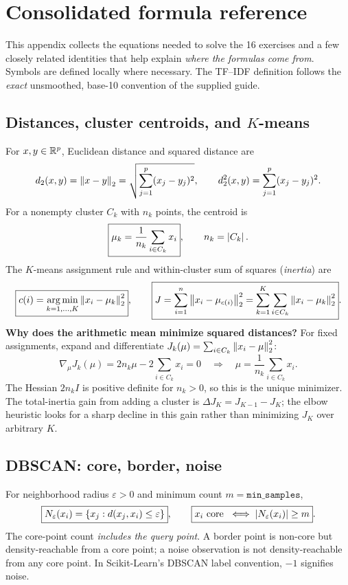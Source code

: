 \section{Consolidated formula reference}
\label{sec:formulas}
This appendix collects the equations needed to solve the 16 exercises and a few closely related identities that help explain \emph{where the formulas come from}. Symbols are defined locally where necessary. The TF--IDF definition follows the \emph{exact} unsmoothed, base-10 convention of the supplied guide.

\subsection{Distances, cluster centroids, and $K$-means}
For $x,y\in\mathbb R^p$, Euclidean distance and squared distance are
\[
d_2(x,y)=\left\lVert x-y\right\rVert_2=\sqrt{\sum_{j=1}^{p}(x_j-y_j)^2},\qquad
d_2^2(x,y)=\sum_{j=1}^{p}(x_j-y_j)^2.
\]
For a nonempty cluster $C_k$ with $n_k$ points, the centroid is
\[
\boxed{\mu_k=\frac{1}{n_k}\sum_{i\in C_k}x_i},\qquad n_k=\left\lvert C_k\right\rvert.
\]
The $K$-means assignment rule and within-cluster sum of squares (\emph{inertia}) are
\[
\boxed{c(i)=\operatorname*{arg\,min}_{k=1,\ldots,K}\left\lVert x_i-\mu_k\right\rVert_2^2},\qquad
\boxed{J=\sum_{i=1}^{n}\left\lVert x_i-\mu_{c(i)}\right\rVert_2^2
=\sum_{k=1}^{K}\sum_{i\in C_k}\left\lVert x_i-\mu_k\right\rVert_2^2}.
\]
\textbf{Why does the arithmetic mean minimize squared distances?} For fixed assignments, expand and differentiate $J_k(\mu)=\sum_{i\in C_k}\left\lVert x_i-\mu\right\rVert_2^2$:
\[
\nabla_{\mu}J_k(\mu)=2n_k\mu-2\sum_{i\in C_k}x_i=0
\quad\Longrightarrow\quad\mu=\frac1{n_k}\sum_{i\in C_k}x_i.
\]
The Hessian $2n_k I$ is positive definite for $n_k>0$, so this is the unique minimizer. The total-inertia gain from adding a cluster is $\Delta J_K=J_{K-1}-J_K$; the elbow heuristic looks for a sharp decline in this gain rather than minimizing $J_K$ over arbitrary $K$.

\subsection{DBSCAN: core, border, noise}
For neighborhood radius $\varepsilon>0$ and minimum count $m=\texttt{min\_samples}$,
\[
\boxed{N_{\varepsilon}(x_i)=\{x_j:d(x_j,x_i)\le\varepsilon\}},\qquad
\boxed{x_i\text{ core }\iff \left\lvert N_\varepsilon(x_i)\right\rvert\ge m}.
\]
The core-point count \emph{includes the query point}. A border point is non-core but density-reachable from a core point; a noise observation is not density-reachable from any core point. In Scikit-Learn's DBSCAN label convention, $-1$ signifies noise.

